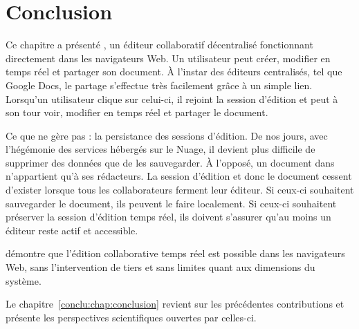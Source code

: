 
\section{Conclusion}
\label{editor:sec:conclusion}

Ce chapitre a présenté \CRATE, un éditeur collaboratif décentralisé fonctionnant
directement dans les navigateurs Web. Un utilisateur peut créer, modifier en
temps réel et partager son document. À l'instar des éditeurs centralisés, tel
que Google Docs, le partage s'effectue très facilement grâce à un simple
lien. Lorsqu'un utilisateur clique sur celui-ci, il rejoint la session d'édition
et peut à son tour voir, modifier en temps réel et partager le document.

Ce que \CRATE ne gère pas : la persistance des sessions d'édition. De nos jours,
avec l'hégémonie des services hébergés sur le Nuage, il devient plus difficile
de supprimer des données que de les sauvegarder. À l'opposé, un document dans
\CRATE n'appartient qu'à ses rédacteurs. La session d'édition et donc le
document cessent d'exister lorsque tous les collaborateurs ferment leur
éditeur. Si ceux-ci souhaitent sauvegarder le document, ils peuvent le faire
localement. Si ceux-ci souhaitent préserver la session d'édition temps réel, ils
doivent s'assurer qu'au moins un éditeur reste actif et accessible.

\CRATE démontre que l'édition collaborative temps réel est possible dans les
navigateurs Web, sans l'intervention de tiers et sans limites quant aux
dimensions du système.

Le chapitre~\ref{conclu:chap:conclusion} revient sur les précédentes
contributions et présente les perspectives scientifiques ouvertes par celles-ci.

